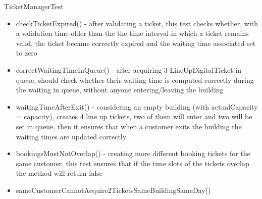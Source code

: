 TicketManagerTest
\begin {itemize}
	\item checkTicketExpired() - after validating a ticket, this test checks whether, with a validation time older than the the time interval in which a ticket remains valid, the ticket became correctly expired and the waiting time associated set to zero
	\item correctWaitingTimeInQueue() - after acquiring 3 LineUpDigitalTicket in queue, should check whether their waiting time is computed correctly during the waiting in queue, without anyone entering/leaving the building
	\item waitingTimeAfterExit() - considering an empty building (with actualCapacity = capacity), creates 4 line up tickets, two of them will enter and two will be set in queue, then it ensures that when a customer exits the building the waiting times are updated correctly
	\item bookingsMustNotOverlap() - creating more different booking tickets for the same customer, this test ensures that if the time slots of the tickets overlap the method will return false
	\item sameCustomerCannotAcquire2TicketsSameBuildingSameDay() 
\end{itemize}